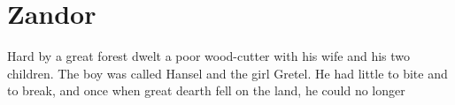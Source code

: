 \cleardoublepage
\newpage
{}
\chapter{Zandor}

Hard by a great forest dwelt a poor wood-cutter with his wife and his two children. The boy was called Hansel and the girl Gretel. He had little to bite and to break, and once when great dearth fell on the land, he could no longer 
